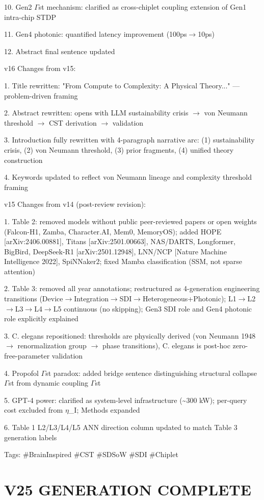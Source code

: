 \documentclass[a4paper,12pt]{article}
\begin{document}
10. Gen2 $\Gamma$st mechanism: clarified as cross-chiplet coupling extension of Gen1 intra-chip STDP

11. Gen4 photonic: quantified latency improvement (100ps$\rightarrow$10ps)

12. Abstract final sentence updated

v16 Changes from v15:

1. Title rewritten: "From Compute to Complexity: A Physical Theory..." --- problem-driven framing

2. Abstract rewritten: opens with LLM sustainability crisis $\rightarrow$ von Neumann threshold $\rightarrow$ CST derivation $\rightarrow$ validation

3. Introduction fully rewritten with 4-paragraph narrative arc: (1) sustainability crisis, (2) von Neumann threshold, (3) prior fragments, (4) unified theory construction

4. Keywords updated to reflect von Neumann lineage and complexity threshold framing

v15 Changes from v14 (post-review revision):

1. Table 2: removed models without public peer-reviewed papers or open weights (Falcon-H1, Zamba, Character.AI, Mem0, MemoryOS); added HOPE [arXiv:2406.00881], Titans [arXiv:2501.00663], NAS/DARTS, Longformer, BigBird, DeepSeek-R1 [arXiv:2501.12948], LNN/NCP [Nature Machine Intelligence 2022], SpiNNaker2; fixed Mamba classification (SSM, not sparse attention)

2. Table 3: removed all year annotations; restructured as 4-generation engineering transitions (Device$\rightarrow$Integration$\rightarrow$SDI$\rightarrow$Heterogeneous+Photonic); L1$\rightarrow$L2$\rightarrow$L3$\rightarrow$L4$\rightarrow$L5 continuous (no skipping); Gen3 SDI role and Gen4 photonic role explicitly explained

3. C. elegans repositioned: thresholds are physically derived (von Neumann 1948 $\rightarrow$ renormalization group $\rightarrow$ phase transitions), C. elegans is post-hoc zero-free-parameter validation

4. Propofol $\Gamma$st paradox: added bridge sentence distinguishing structural collapse $\Gamma$st from dynamic coupling $\Gamma$st

5. GPT-4 power: clarified as system-level infrastructure (\textasciitilde{}300 kW); per-query cost excluded from $\eta$\_I; Methods expanded

6. Table 1 L2/L3/L4/L5 ANN direction column updated to match Table 3 generation labels

Tags: \#BrainInspired \#CST \#SDSoW \#SDI \#Chiplet

\section*{V25 GENERATION COMPLETE}
\end{document}
